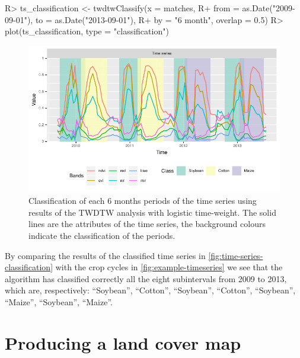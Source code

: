 \documentclass[article,shortnames]{jss}
\begin{document}
\begin{CodeChunk}

\begin{CodeInput}
R> ts_classification <- twdtwClassify(x = matches, 
R+   from = as.Date("2009-09-01"), to = as.Date("2013-09-01"), 
R+   by = "6 month", overlap = 0.5)
R> plot(ts_classification, type = "classification") 
\end{CodeInput}
\begin{figure}[!ht]

{\centering \includegraphics{dtwSat_files/figure-latex/time-series-classification-1} 

}

\caption[Classification of each 6 months periods of the time series using results of the TWDTW analysis with logistic time-weight]{Classification of each 6 months periods of the time series using results of the TWDTW analysis with logistic time-weight. The solid lines are the attributes of the time series, the background colours indicate the classification of the periods.}\label{fig:time-series-classification}
\end{figure}
\end{CodeChunk}

By comparing the results of the classified time series in
\autoref{fig:time-series-classification} with the crop cycles in
\autoref{fig:example-timeseries} we see that the algorithm has
classified correctly all the eight subintervals from 2009 to 2013, which
are, respectively: ``Soybean'', ``Cotton'', ``Soybean'', ``Cotton'',
``Soybean'', ``Maize'', ``Soybean'', ``Maize''.

\hypertarget{producing-a-land-cover-map}{%
\section{Producing a land cover map}\label{producing-a-land-cover-map}}
\end{document}
